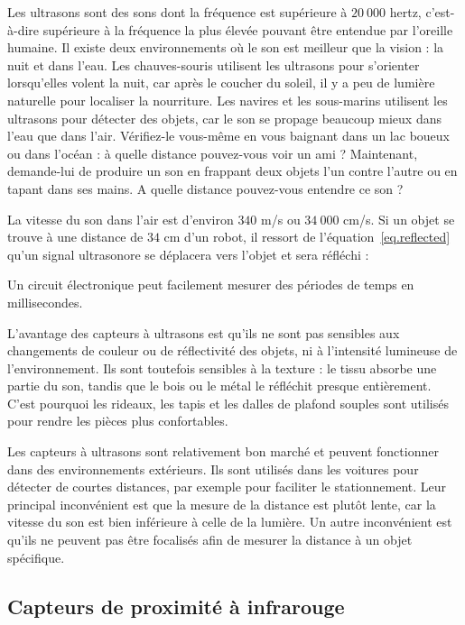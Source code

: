 Les ultrasons sont des sons dont la fréquence est supérieure à $20\:000$ hertz, c'est-à-dire supérieure à la fréquence la plus élevée pouvant être entendue par l'oreille humaine. Il existe deux environnements où le son est meilleur que la vision : la nuit et dans l'eau. Les chauves-souris utilisent les ultrasons pour s'orienter lorsqu'elles volent la nuit, car après le coucher du soleil, il y a peu de lumière naturelle pour localiser la nourriture. Les navires et les sous-marins utilisent les ultrasons pour détecter des objets, car le son se propage beaucoup mieux dans l'eau que dans l'air. Vérifiez-le vous-même en vous baignant dans un lac boueux ou dans l'océan : à quelle distance pouvez-vous voir un ami ? Maintenant, demande-lui de produire un son en frappant deux objets l'un contre l'autre ou en tapant dans ses mains. A quelle distance pouvez-vous entendre ce son ? 

La vitesse du son dans l'air est d'environ $340$ m/s ou $34\:000$ cm/s. Si un objet se trouve à une distance de $34$ cm d'un robot, il ressort de l'équation~\ref{eq.reflected} qu'un signal ultrasonore se déplacera vers l'objet et sera réfléchi :

Un circuit électronique peut facilement mesurer des périodes de temps en millisecondes.

L'avantage des capteurs à ultrasons est qu'ils ne sont pas sensibles aux changements de couleur ou de réflectivité des objets, ni à l'intensité lumineuse de l'environnement. Ils sont toutefois sensibles à la texture : le tissu absorbe une partie du son, tandis que le bois ou le métal le réfléchit presque entièrement. C'est pourquoi les rideaux, les tapis et les dalles de plafond souples sont utilisés pour rendre les pièces plus confortables.

Les capteurs à ultrasons sont relativement bon marché et peuvent fonctionner dans des environnements extérieurs. Ils sont utilisés dans les voitures pour détecter de courtes distances, par exemple pour faciliter le stationnement. Leur principal inconvénient est que la mesure de la distance est plutôt lente, car la vitesse du son est bien inférieure à celle de la lumière. Un autre inconvénient est qu'ils ne peuvent pas être focalisés afin de mesurer la distance à un objet spécifique.

\subsection{Capteurs de proximité à infrarouge}

